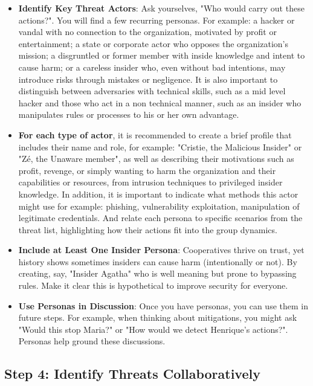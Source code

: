 \begin{itemize}
    \item \textbf{Identify Key Threat Actors}: Ask yourselves, "Who would carry out these actions?".
    You will find a few recurring personas. For example:
    a hacker or vandal with no connection to the organization, motivated by profit or
    entertainment; a state or corporate actor who opposes the organization's
    mission; a disgruntled or former member with inside knowledge and intent to
    cause harm; or a careless insider who, even without bad intentions, may
    introduce risks through mistakes or negligence. It is also important to
    distinguish between adversaries with technical skills, such as a mid level
    hacker and those who act in a non technical manner, such as an insider who
    manipulates rules or processes to his or her own advantage.

    \item \textbf{For each type of actor}, it is recommended to create a brief profile that
    includes their name and role, for example: "Cristie, the Malicious Insider" or "Zé,
    the Unaware member", as well as describing their motivations such as profit,
    revenge, or simply wanting to harm the organization and their capabilities or
    resources, from intrusion techniques to privileged insider knowledge. In
    addition, it is important to indicate what methods this actor might use for example:
    phishing, vulnerability exploitation, manipulation of legitimate credentials.
    And relate each persona to specific scenarios from the threat list, highlighting
    how their actions fit into the group dynamics.
   
    \item \textbf{Include at Least One Insider Persona}: Cooperatives thrive on trust, yet history shows sometimes insiders
    can cause harm (intentionally or not). By creating, say, "Insider Agatha" who is well meaning but
    prone to bypassing rules. Make it clear this is hypothetical to improve security for everyone.
    
    \item \textbf{Use Personas in Discussion}: Once you have personas, you can use them in future steps.
    For example, when thinking about mitigations, you might ask "Would this stop Maria?" or
    "How would we detect Henrique's actions?". Personas help ground these discussions.

\end{itemize}

\subsection{Step 4: Identify Threats Collaboratively}
\label{subsec:Step4}

